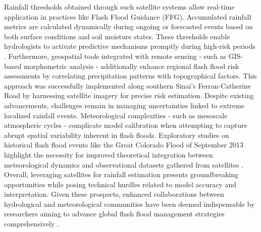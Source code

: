 Rainfall thresholds obtained through such satellite systems allow real-time application in practices like Flash Flood Guidance (FFG). Accumulated rainfall metrics are calculated dynamically during ongoing or forecasted events based on both surface conditions and soil moisture states. These thresholds enable hydrologists to activate predictive mechanisms promptly during high-risk periods \citep{Luong2021}.
Furthermore, geospatial tools integrated with remote sensing - such as GIS-based morphometric analysis - additionally enhance regional flash flood risk assessments by correlating precipitation patterns with topographical factors. This approach was successfully implemented along southern Sinai's Ferran-Catherine Road by harnessing satellite imagery for precise risk estimation.
Despite existing advancements, challenges remain in managing uncertainties linked to extreme localized rainfall events. Meteorological complexities - such as mesoscale atmospheric cycles - complicate model calibration when attempting to capture abrupt spatial variability inherent in flash floods. Exploratory studies on historical flash flood events like the Great Colorado Flood of September 2013 highlight the necessity for improved theoretical integration between meteorological dynamics and observational datasets gathered from satellites \citep{Yang2022}.
Overall, leveraging satellites for rainfall estimation presents groundbreaking opportunities while posing technical hurdles related to model accuracy and interpretation. Given these prospects, enhanced collaborations between hydrological and meteorological communities have been deemed indispensable by researchers aiming to advance global flash flood management strategies comprehensively \citep{Barthold2015}\citep{Khan2020}.
